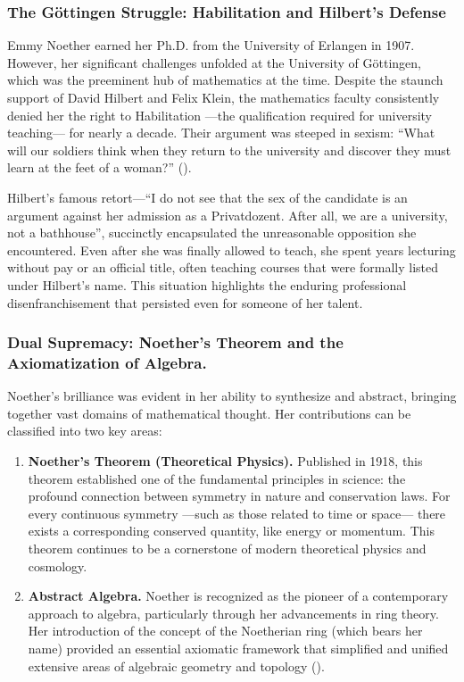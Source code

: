\subsubsection{The Göttingen Struggle: Habilitation and Hilbert's Defense}
Emmy Noether earned her Ph.D. from the University of Erlangen in 1907. However, her significant challenges unfolded at the University of Göttingen, which was the preeminent hub of mathematics at the time. Despite the staunch support of David Hilbert and Felix Klein, the mathematics faculty consistently denied her the right to Habilitation —the qualification required for university teaching— for nearly a decade. Their argument was steeped in sexism: ``What will our soldiers think when they return to the university and discover they must learn at the feet of a woman?'' (\cite{reid1970}). 

Hilbert's famous retort—``I do not see that the sex of the candidate is an argument against her admission as a Privatdozent. After all, we are a university, not a bathhouse'', succinctly encapsulated the unreasonable opposition she encountered. Even after she was finally allowed to teach, she spent years lecturing without pay or an official title, often teaching courses that were formally listed under Hilbert's name. This situation highlights the enduring professional disenfranchisement that persisted even for someone of her talent.
\subsubsection{Dual Supremacy: Noether's Theorem and the Axiomatization of Algebra.}
Noether's brilliance was evident in her ability to synthesize and abstract, bringing together vast domains of mathematical thought. Her contributions can be classified into two key areas:
\begin{enumerate}
    \item \textbf{Noether's Theorem (Theoretical Physics).} Published in 1918, this theorem established one of the fundamental principles in science: the profound connection between symmetry in nature and conservation laws. For every continuous symmetry —such as those related to time or space— there exists a corresponding conserved quantity, like energy or momentum. This theorem continues to be a cornerstone of modern theoretical physics and cosmology.
    \item \textbf{Abstract Algebra.} Noether is recognized as the pioneer of a contemporary approach to algebra, particularly through her advancements in ring theory. Her introduction of the concept of the Noetherian ring (which bears her name) provided an essential axiomatic framework that simplified and unified extensive areas of algebraic geometry and topology (\cite{dick1981}).
\end{enumerate}
